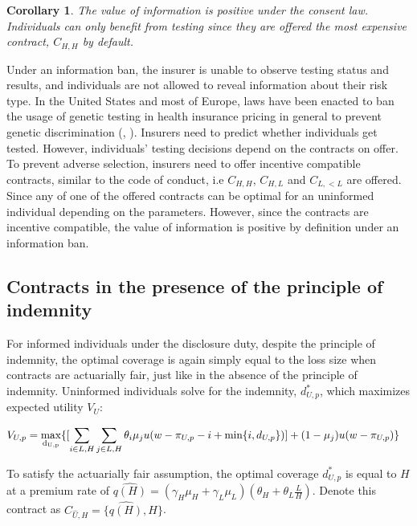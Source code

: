\documentclass[natbib=false,preprint,12pt]{elsarticle}
\theoremstyle{plain}
\newtheorem{corollary}[theorem]{Corollary}
\theoremstyle{definition}
\theoremstyle{plain}
\theoremstyle{TheoremNum}
\theoremstyle{CorollaryNum}
\theoremstyle{PropositionNum}
\theoremstyle{TheoremNum}
\begin{document}
\setcounter{theorem}{2}
\renewcommand{\thetheorem}{\arabic{theorem}}
\begin{corollary}
    The value of information is positive under the consent law. Individuals can only benefit from testing since they are offered the most expensive contract, $C_{H,H}$ by default.
\end{corollary}

Under an information ban, the insurer is unable to observe testing status and results, and individuals are not allowed to reveal information about their risk type. In the United States and most of Europe, laws have been enacted to ban the usage of genetic testing in health insurance pricing in general to prevent genetic discrimination (\citeauthor{nill2019use}, \citeyear{nill2019use}). Insurers need to predict whether individuals get tested. However, individuals' testing decisions depend on the contracts on offer. To prevent adverse selection, insurers need to offer incentive compatible contracts, similar to the code of conduct, i.e $C_{H,H}$, $C_{H,L}$ and $C_{L,<L}$ are offered. Since any of one of the offered contracts can be optimal for an uninformed individual depending on the parameters. However, since the contracts are incentive compatible, the value of information is positive by definition under an information ban.

\subsection{Contracts in the presence of the principle of indemnity}

For informed individuals under the disclosure duty, despite the principle of indemnity, the optimal coverage is again simply equal to the loss size when contracts are actuarially fair, just like in the absence of the principle of indemnity. Uninformed individuals solve for the indemnity, $d_{U,p}^*$, which maximizes expected utility $V_{U}$:

\begin{align}
V_{U,p} = \underset{\rm d_{U,p}}{\rm max } & \{[\sum_{i \in {L,H}} \sum_{j \in {L,H}} \theta_i \mu_j u(w-\pi_{U,p}-i+\text{min}\{i,d_{U,p}\})] + (1-\mu_j)u(w-\pi_{U,p})\}
\label{uninformed_p_maxproblem_freqsev}
\end{align}

To satisfy the actuarially fair assumption, the optimal coverage $d_{U,p}^*$ is equal to $H$ at a premium rate of $\widehat{q(H)}= (\gamma_H \mu_H + \gamma_L \mu_L)(\theta_H + \theta_L \frac{L}{H})$. Denote this contract as $C_{\widehat{U},H} = \{\widehat{q(H)}, H\}$.
\end{document}
